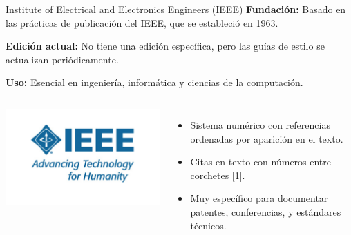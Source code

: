 \documentclass[
11pt, %
]{beamer}
\begin{document}
\begin{frame}{Institute of Electrical and Electronics Engineers (IEEE)}
	\textbf{Fundación:} Basado en las prácticas de publicación del IEEE, que se estableció en 1963.

	\textbf{Edición actual:} No tiene una edición específica, pero las guías de estilo se actualizan periódicamente.

	\textbf{Uso:} Esencial en ingeniería, informática y ciencias de la computación.
	\vspace{0.2cm}
	\begin{columns}[T]
		\centering
		\includegraphics[width=\textwidth]{ieee_logo_140yrs.png} %
		\begin{itemize}
			\item Sistema numérico con referencias ordenadas por aparición en el texto.
			\item Citas en texto con números entre corchetes [1].
			\item Muy específico para documentar patentes, conferencias, y estándares técnicos.
		\end{itemize}
	\end{columns}
\end{frame}
\end{document}
